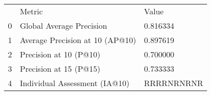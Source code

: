 \begin{tabular}{lll}
 & Metric & Value \\
0 & Global Average Precision & 0.816334 \\
1 & Average Precision at 10 (AP@10) & 0.897619 \\
2 & Precision at 10 (P@10) & 0.700000 \\
3 & Precision at 15 (P@15) & 0.733333 \\
4 & Individual Assessment (IA@10) & RRRRNRNRNR \\
\end{tabular}
